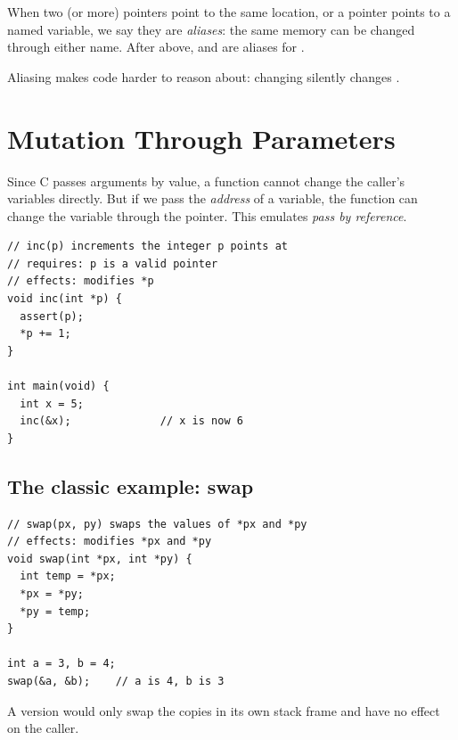 \begin{definition}
When two (or more) pointers point to the same location, or a pointer points to a named
variable, we say they are \emph{aliases}: the same memory can be changed through either name.
After  above,  and  are aliases for .
\end{definition}

Aliasing makes code harder to reason about: changing  silently changes .

\section{Mutation Through Parameters}

Since C passes arguments by value, a function cannot change the caller's variables directly.
But if we pass the \emph{address} of a variable, the function can change the variable through
the pointer. This emulates \emph{pass by reference}.
\begin{lstlisting}[style=c]
// inc(p) increments the integer p points at
// requires: p is a valid pointer
// effects: modifies *p
void inc(int *p) {
  assert(p);
  *p += 1;
}

int main(void) {
  int x = 5;
  inc(&x);              // x is now 6
}
\end{lstlisting}

\subsection{The classic example: swap}
\begin{lstlisting}[style=c]
// swap(px, py) swaps the values of *px and *py
// effects: modifies *px and *py
void swap(int *px, int *py) {
  int temp = *px;
  *px = *py;
  *py = temp;
}

int a = 3, b = 4;
swap(&a, &b);    // a is 4, b is 3
\end{lstlisting}
A version  would only swap the copies in its own stack frame and
have no effect on the caller.

\begin{center}
\end{center}

